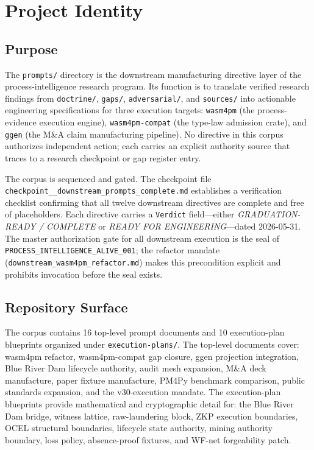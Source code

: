 
\section{Project Identity}
\label{sec:prompts-identity}

\subsection{Purpose}
\label{sec:prompts-identity-purpose}

The \texttt{prompts/} directory is the downstream manufacturing directive layer of the
process-intelligence research program. Its function is to translate verified research
findings from \texttt{doctrine/}, \texttt{gaps/}, \texttt{adversarial/}, and
\texttt{sources/} into actionable engineering specifications for three execution
targets: \texttt{wasm4pm} (the process-evidence execution engine),
\texttt{wasm4pm-compat} (the type-law admission crate), and \texttt{ggen} (the
M\&A claim manufacturing pipeline). No directive in this corpus authorizes independent
action; each carries an explicit authority source that traces to a research checkpoint
or gap register entry.

The corpus is sequenced and gated. The checkpoint file
\texttt{checkpoint\_\_downstream\_prompts\_complete.md} establishes a verification
checklist confirming that all twelve downstream directives are complete and free of
placeholders. Each directive carries a \texttt{Verdict} field---either
\emph{GRADUATION-READY / COMPLETE} or \emph{READY FOR ENGINEERING}---dated
2026-05-31. The master authorization gate for all downstream execution is the seal of
\texttt{PROCESS\_INTELLIGENCE\_ALIVE\_001}; the refactor mandate
(\texttt{downstream\_wasm4pm\_refactor.md}) makes this precondition explicit and
prohibits invocation before the seal exists.

\subsection{Repository Surface}
\label{sec:prompts-identity-surface}

The corpus contains 16 top-level prompt documents and 10 execution-plan blueprints
organized under \texttt{execution-plans/}. The top-level documents cover: wasm4pm
refactor, wasm4pm-compat gap closure, ggen projection integration, Blue River Dam
lifecycle authority, audit mesh expansion, M\&A deck manufacture, paper fixture
manufacture, PM4Py benchmark comparison, public standards expansion, and the
v30-execution mandate. The execution-plan blueprints provide mathematical and
cryptographic detail for: the Blue River Dam bridge, witness lattice, raw-laundering
block, ZKP execution boundaries, OCEL structural boundaries, lifecycle state
authority, mining authority boundary, loss policy, absence-proof fixtures, and WF-net
forgeability patch.

